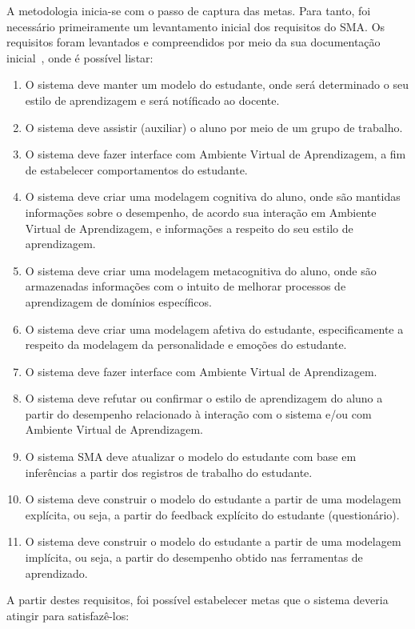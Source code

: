 A metodologia inicia-se com o passo de captura das metas. Para tanto, foi necessário primeiramente um levantamento inicial dos requisitos do SMA. Os requisitos foram levantados e compreendidos por meio da sua documentação inicial~\cite{editalFrank}, onde é possível listar:

\begin{enumerate}
	\item O sistema deve manter um modelo do estudante, onde será determinado o seu estilo de aprendizagem e será notíficado ao docente.
	\item O sistema deve assistir (auxiliar) o aluno por meio de um grupo de trabalho.
	\item O sistema deve fazer interface com Ambiente Virtual de Aprendizagem, a fim de estabelecer comportamentos do estudante.
	\item O sistema deve criar uma modelagem cognitiva do aluno, onde são mantidas informações sobre o desempenho, de acordo sua interação em Ambiente Virtual de Aprendizagem, e informações a respeito do seu estilo de aprendizagem.
	\item O sistema deve criar uma modelagem metacognitiva do aluno, onde são armazenadas informações com o intuito de melhorar processos de aprendizagem de domínios específicos.
	\item O sistema deve criar uma modelagem afetiva do estudante, especificamente a respeito da modelagem da personalidade e emoções do estudante.
	\item O sistema deve fazer interface com Ambiente Virtual de Aprendizagem.
	\item O sistema deve refutar ou confirmar o estilo de aprendizagem do aluno a partir do desempenho relacionado à interação com o sistema e/ou com Ambiente Virtual de Aprendizagem.
	\item O sistema SMA deve atualizar o modelo do estudante com base em inferências a partir dos registros de trabalho do estudante.
	\item O sistema deve construir o modelo do estudante a partir de uma modelagem explícita, ou seja, a partir do feedback explícito do estudante (questionário).
	\item O sistema deve construir o modelo do estudante a partir de uma modelagem implícita, ou seja, a partir do desempenho obtido nas ferramentas de aprendizado.
\end{enumerate}

A partir destes requisitos, foi possível estabelecer metas que o sistema deveria atingir para satisfazê-los:

